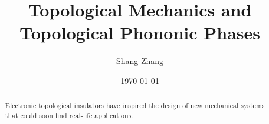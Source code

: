 \documentclass[aps,pre,preprint,groupedaddress]{revtex4-1}
\begin{document}

\title{\textbf{Topological Mechanics and Topological Phononic Phases}}


\author{Shang Zhang}


\date{\today}

\begin{abstract}
Electronic topological insulators have inspired the design of new mechanical systems that could soon find real-life applications.
\end{abstract}

\pacs{}

\maketitle

\end{document}
